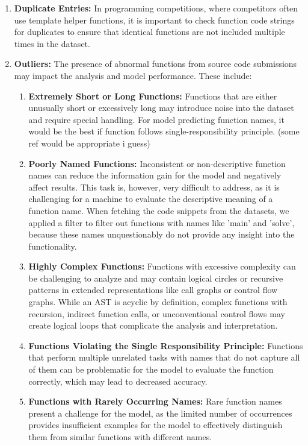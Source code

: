 \documentclass[10pt,english,a4paper]{report}
\begin{document}
\begin{enumerate}
    \item \textbf{Duplicate Entries:} 
    \label{item:duplicate_entries} 
    In programming competitions, where competitors often use template 
    helper functions, it is important to check function code strings 
    for duplicates to ensure that identical functions are not included 
    multiple times in the dataset.

    \item \textbf{Outliers:} 
    \label{item:outliers}
    The presence of abnormal functions from source code submissions may impact the analysis and model performance. These include:
    \begin{enumerate}
        \item \textbf{Extremely Short or Long Functions:} 
        \label{item:short_long_functions}
        Functions that are either unusually short or excessively long may introduce noise into the dataset and require special handling. For model predicting function names, it would be the best if function follows single-responsibility principle. (some ref would be appropriate i guess)
        
        \item \textbf{Poorly Named Functions:} 
        \label{item:poorly_named_functions}
        Inconsistent or non-descriptive function names can reduce the information gain for the model and negatively affect results. This task is, however, very difficult to address, as it is challenging for a machine to evaluate the descriptive meaning of a function name. When fetching the code snippets from the datasets, we applied a filter to filter out functions with names like 'main' and 'solve', because these names unquestionably do not provide any insight into the functionality.

        \item \textbf{Highly Complex Functions:} 
        \label{item:complex_functions}
        Functions with excessive complexity can be challenging to analyze and may contain logical circles or recursive patterns in extended representations like call graphs or control flow graphs. While an AST is acyclic by definition, complex functions with recursion, indirect function calls, or unconventional control flows may create logical loops that complicate the analysis and interpretation.

        \item \textbf{Functions Violating the Single Responsibility Principle:} 
        \label{item:single_responsibility}
        Functions that perform multiple unrelated tasks with names that do not capture all of them can be problematic for the model to evaluate the function correctly, which may lead to decreased accuracy.

        \item \textbf{Functions with Rarely Occurring Names:} 
        \label{item:rare_names}
        Rare function names present a challenge for the model, as the limited number of occurrences provides insufficient examples for the model to effectively distinguish them from similar functions with different names.
    \end{enumerate}
\end{enumerate}
\end{document}
